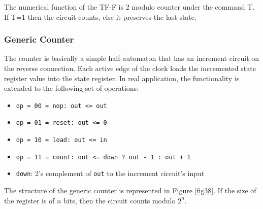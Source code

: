 The numerical function of the TF-F is 2 modulo counter under the command T. If T=1 then the circuit counts, else it preserves the last state.

\subsubsection{Generic Counter}

The counter is basically a simple half-automaton that has an increment circuit on the reverse connection. Each active edge of the clock loads the incremented state register value into the state register. In real application, the functionality is extended to the following set of operations:


\begin{itemize}
    \item {\tt op = 00 = nop: out <= out}
    \item {\tt op = 01 = reset: out <= 0}
    \item {\tt op = 10 = load: out <= in}
    \item {\tt op = 11 = count: out <= down ? out - 1 : out + 1}
    \item {\tt down}: 2's complement of {\tt out} to the increment circuit's input
\end{itemize}

The structure of the generic counter is represented in Figure \ref{fig38}. If the size of the register is of $n$ bits, then the circuit counts modulo $2^n$.


